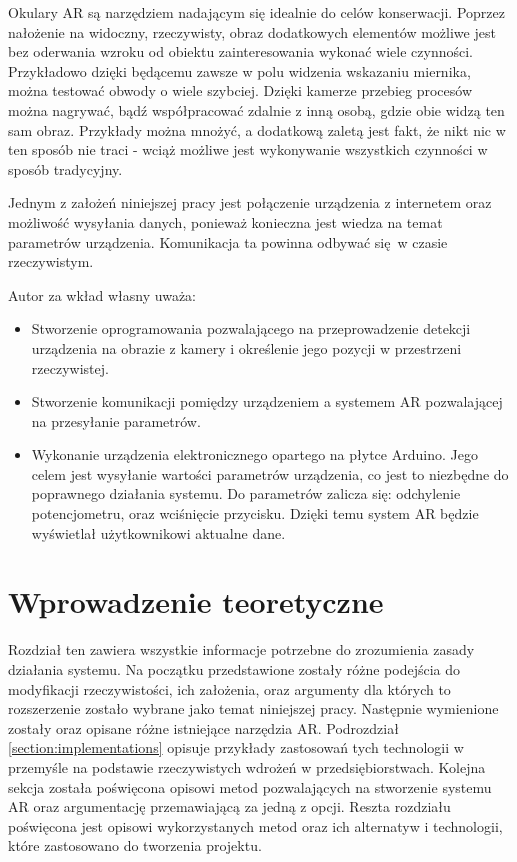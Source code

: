 \documentclass[12pt,twoside,polish]{article}
\begin{document}
Okulary AR są narzędziem nadającym się idealnie do celów konserwacji. Poprzez nałożenie na widoczny, rzeczywisty, obraz dodatkowych elementów możliwe jest bez oderwania wzroku od obiektu zainteresowania wykonać wiele czynności. Przykładowo dzięki będącemu zawsze w polu widzenia wskazaniu miernika, można testować obwody o wiele szybciej. Dzięki kamerze przebieg procesów można nagrywać, bądź współpracować zdalnie z inną osobą, gdzie obie widzą ten sam obraz. Przykłady można mnożyć, a dodatkową zaletą jest fakt, że nikt nic w ten sposób nie traci - wciąż możliwe jest wykonywanie wszystkich czynności w sposób tradycyjny.

Jednym z założeń niniejszej pracy jest połączenie urządzenia z internetem oraz możliwość wysyłania danych, ponieważ konieczna jest wiedza na temat parametrów urządzenia. Komunikacja ta powinna odbywać się w czasie rzeczywistym.

Autor za wkład własny uważa:
\begin{itemize}
	\item Stworzenie oprogramowania pozwalającego na przeprowadzenie detekcji urządzenia na obrazie z kamery i określenie jego pozycji w przestrzeni rzeczywistej.
	\item Stworzenie komunikacji pomiędzy urządzeniem a systemem AR pozwalającej na przesyłanie parametrów.
	\item Wykonanie urządzenia elektronicznego opartego na płytce Arduino. Jego celem jest wysyłanie wartości parametrów urządzenia, co jest to niezbędne do poprawnego działania systemu. Do parametrów zalicza się: odchylenie potencjometru, oraz wciśnięcie przycisku. Dzięki temu system AR będzie wyświetlał użytkownikowi aktualne dane.
\end{itemize}


\clearpage


\section{Wprowadzenie teoretyczne}

Rozdział ten zawiera wszystkie informacje potrzebne do zrozumienia zasady działania systemu. Na początku przedstawione zostały różne podejścia do modyfikacji rzeczywistości, ich założenia, oraz argumenty dla których to rozszerzenie zostało wybrane jako temat niniejszej pracy. Następnie wymienione zostały oraz opisane różne istniejące narzędzia AR. Podrozdział \ref{section:implementations} opisuje przykłady zastosowań tych technologii w przemyśle na podstawie rzeczywistych wdrożeń w przedsiębiorstwach. Kolejna sekcja została poświęcona opisowi metod pozwalających na stworzenie systemu AR oraz argumentację przemawiającą za jedną z opcji. Reszta rozdziału poświęcona jest opisowi wykorzystanych metod oraz ich alternatyw i technologii, które zastosowano do tworzenia projektu.
\end{document}
